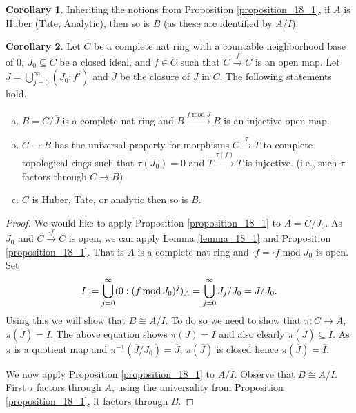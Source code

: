\documentclass[10pt]{article}
\numberwithin{equation}{section}
\theoremstyle{definition}
\newtheorem{corollary}{Corollary} [subsection]
\DeclareMathOperator{\tmod}{mod}
\newcommand{\defeq}{\vcentcolon=}
\begin{document}
\begin{corollary}
    \label{corollary_18_1_a}
    Inheriting the notions from Proposition \ref{proposition_18_1}, if $A$ is Huber (Tate, Analytic), then so is $B$ (as these are identified by $A/I$).
\end{corollary}
\begin{corollary}
    \label{corollary_18_1}
    Let $C$ be a complete nat ring with a countable neighborhood base of $0$, $J_0\subseteq C$ be a closed ideal, and $f\in C$ such that $C\stackrel{f}{\to}C$ is an open map. Let $J = \bigcup_{j=0}^\infty (J_0:f^j)$ and $\overline{J}$ be the closure of $J$ in $C$. The following statements hold.
    \begin{enumerate}[a.]
    \item $B=C/\overline{J}$ is a complete nat ring and $B\stackrel{f\tmod\overline{J}}{\to}B$ is an injective open map.
    \item $C\to B$ has the universal property for morphisms $C\stackrel{\tau}{\to}T$ to complete topological rings such that $\tau(J_0)=0$ and $T\stackrel{\tau(f)}{\to}T$ is injective. (i.e., such $\tau$ factors through $C\to B$)
    \item $C$ is Huber, Tate, or analytic then so is $B$.
    \end{enumerate}
\end{corollary}
\begin{proof}
    We would like to apply Proposition \ref{proposition_18_1} to $A = C/J_0$. As $J_0$ and $C\stackrel{\cdot f}{\to}C$ is open, we can apply Lemma \ref{lemma_18_1} and Proposition \ref{proposition_18_1}. That is $A$ is a complete nat ring and $\cdot \overline{f} = \cdot f\tmod{J_0}$ is open. Set
    \begin{equation*}
        I\defeq\bigcup_{j=0}^\infty(0:(f\tmod J_0)^j)_A = \bigcup_{j=0}^\infty J_j/J_0 = J/J_0.
    \end{equation*}
    Using this we will show that $B\cong A/\overline{I}$. To do so we need to show that $\pi:C\to A$, $\pi(\overline{J}) = \overline{I}$. The above equation shows $\pi(J) = I$ and also clearly $\pi(\overline{J})\subseteq\overline{I}$. As $\pi$ is a quotient map and $\pi^{-1}(\overline{J}/J_0) = \overline{J}$, $\pi(\overline{J})$ is closed hence $\pi(\overline{J})=\overline{I}$.
    \par We now apply Proposition \ref{proposition_18_1} to $A/\overline{I}$. Observe that $B\cong A/\overline{I}$. First $\tau$ factors through $A$, using the universality from Proposition \ref{proposition_18_1}, it factors through $B$.
\end{proof}
\end{document}
